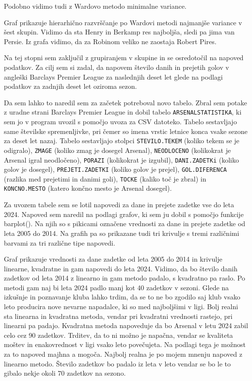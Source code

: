 \documentclass[11pt,a4paper]{article}
\begin{document}
Podobno vidimo tudi z Wardovo metodo minimalne variance. 


Graf prikazuje hierarhično razvrščanje po Wardovi metodi najmanjše variance v šest skupin.
Vidimo da sta Henry in Berkamp res najboljša, sledi pa jima van Persie. Iz grafa vidimo, da za Robinom veliko ne zaostaja Robert Pires.

\newpage
Na tej stopni sem zaključil z grupiranjem v skupine in se osredotočil na napoved podatkov. Za cilj sem si zadal, da napovem število danih in prejetih golov v angleški Barclays Premier League za naslednjih deset let glede na podlagi podatkov za zadnjih deset let oziroma sezon.

Da sem lahko to naredil sem za začetek potreboval novo tabelo. Zbral sem potake z uradne strani  
Barclays Premier League in dobil tabelo \texttt{AR\-SE\-NAL\-STA\-TIST\-IKA}, ki sem jo v program uvozil s pomočjo uvoza za CSV datoteko. Tabelo sestavljajo same številske spremenljivke, pri čemer so imena vrstic letnice konca vsake sezone za deset let nazaj. Tabelo sestavljajo stolpci \verb|STEVILO.TEKEM| (koliko tekem se je odigralo), \verb|ZMAGE| (koliko zmag je dosegel Arsenal), \verb|NEODLOCENO| (kolikokrat je Arsenal igral neodločeno), \verb|PORAZI| (kolikokrat je izgubil), \verb|DANI.ZADETKi| (koliko golov je dosegel), \verb|PREJETI.ZADETKI| (koliko golov je prejel), \verb|GOL.DIFERENCA| (razlika med prejetimi in danimi goli), \verb|TOCKE| (kaliko toč je zbral) in \verb|KONCNO.MESTO| (katero končno mesto je Arsenal dosegel).

Za uvozem tabele sem se lotil napovedi za dane in prejete zadetke vse do leta 2024. Napoved sem naredil na podlagi grafov, ki sem ju dobil s pomočjo funkcije barplot(). Na njih so s pikicami označene vrednosti za dane in prejete zadetke od leta 2005 do 2014. Na grafih pa so prikazane tudi tri krivulje s tremi različnimi barvami za tri različne tipe napovedi.


Graf prikazuje vrednosti za dane zadetke od leta 2005 do 2014 in krivulje linearne, kvadratne in gam napovedi do leta 2024. Vidimo, da bo število danih zadetkov od leta 2014 z linearno in gam metodo padalo, s kvadratno pa raslo. Po metodi gam naj bi leta 2024 padlo manj kot 40 zadetkov v sezoni. Glede na izkušnje in poznavanje kluba lahko trdim, da se to ne bo zgodilo saj klub vsako leto producira nove nevarne napadalce, ki so med najboljšimi v ligi. Bolj realni sta linearna in kvadratna metoda, vendar pri kvadratni vrednosti rastejo, pri linearni pa padajo. Kvadratna metoda napoveduje da bo Arsenal v letu 2024 zabil celo cez 90 zadetkov. Trditev, da to ni možno je napačna, vendar se kvaliteta moštev in enakovrednost v ligi vsako leto povečujeta. Na podlagi tega je možnost za to napoved majhna a mogoča. Najbolj realna je po mojem mnenju napoved z linearno metodo. Število zadetkov bo padalo iz leta v leto vendar se bo le to gibalo nekje okoli 70 zadetkov na sezono. 
\end{document}
